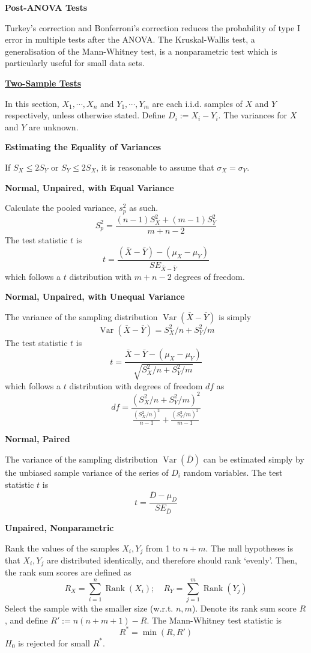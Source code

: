 \documentclass[a4paper]{article}
\newcommand{\heading}[1]{{\small\underline{\textbf{#1}}}\smallskip}
\newcommand{\subheading}[1]{{\scriptsize\textbf{#1}}}
\renewenvironment{section}[1]
  {
    \subheading{#1}\smallskip

  }{
    \medskip
  }
\DeclareMathOperator{\Rank}{Rank}
\DeclareMathOperator{\Var}{Var}
\begin{document}
\begin{multicols*}{4}
\begin{section}{Post-ANOVA Tests}
  Turkey's correction and Bonferroni's correction reduces the probability of
  type I error in multiple tests after the ANOVA. The Kruskal-Wallis test, a
  generalisation of the Mann-Whitney test, is a nonparametric test which is
  particularly useful for small data sets.
\end{section}

\heading{Two-Sample Tests}

In this section, $X_1, \cdots, X_n$ and $Y_1, \cdots, Y_m$ are each i.i.d.
samples of $X$ and $Y$ respectively, unless otherwise stated. Define $D_i := X_i
- Y_i$. The variances for $X$ and $Y$ are unknown. \smallskip

\begin{section}{Estimating the Equality of Variances}
  If $S_X \leq 2S_Y$ or $S_Y \leq 2S_X$, it is reasonable to assume that
  $\sigma_X = \sigma_Y$.
\end{section}

\begin{section}{Normal, Unpaired, with Equal Variance}
  Calculate the pooled variance, $s_p^2$ as such.
  $$S_p^2 = \frac{(n-1)S_X^2 + (m-1) S_Y^2}{m + n - 2}$$
  The test statistic $t$ is
  $$t = \frac{(\bar{X}-\bar{Y}) - (\mu_X - \mu_Y)}{SE_{\bar{X}-\bar{Y}}}$$
  which follows a $t$ distribution with $m + n - 2$ degrees of freedom.
\end{section}

\begin{section}{Normal, Unpaired, with Unequal Variance}
  The variance of the sampling distribution $\Var(\bar{X}-\bar{Y})$ is simply
  $$\Var(\bar{X}-\bar{Y}) = S^2_X/n + S^2_Y/m$$
  The test statistic $t$ is
  $$t = \frac{\bar{X}-\bar{Y} - (\mu_X-\mu_Y)}{\sqrt{S^2_X/n + S^2_Y/m}}$$
  which follows a $t$ distribution with degrees of freedom $df$ as
  $$df = \frac{(S^2_X/n + S^2_Y/m)^2}{
    \frac{(S^2_X/n)^2}{n-1} + \frac{(S^2_Y/m)^2}{m-1}
  }$$
\end{section}

\begin{section}{Normal, Paired}
  The variance of the sampling distribution $\Var(\bar{D})$ can be estimated
  simply by the unbiased sample variance of the series of $D_i$ random
  variables. The test statistic $t$ is
  $$t = \frac{\bar{D} - \mu_D}{SE_{\bar{D}}}$$
\end{section}

\begin{section}{Unpaired, Nonparametric}
  Rank the values of the samples $X_i, Y_j$ from 1 to $n + m$. The null
  hypotheses is that $X_i, Y_j$ are distributed identically, and therefore
  should rank `evenly'. Then, the rank sum scores are defined as
  $$R_X = \sum^n_{i=1} \Rank(X_i); \quad
    R_Y = \sum^m_{j=1} \Rank(Y_j)$$
  Select the sample with the smaller size (w.r.t. $n, m$). Denote its rank sum
  score $R$, and define $R' := n(n+m+1) - R$. The Mann-Whitney test statistic is
  $$R^* = \min(R, R')$$
  $H_0$ is rejected for small $R^*$.
\end{section}


\end{multicols*}
\end{document}
